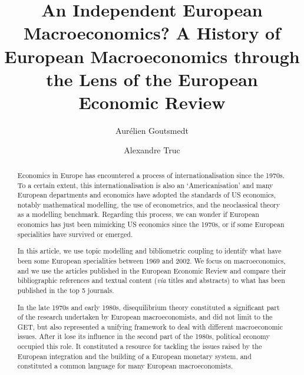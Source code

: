 \documentclass[]{elsarticle} %
\begin{document}
\begin{frontmatter}

  \title{An Independent European Macroeconomics? A History of European
Macroeconomics through the Lens of the European Economic Review}
    \author[1]{Aurélien Goutsmedt%
  }
  
    \author[2]{Alexandre Truc}
  
  
  \begin{abstract}
  Economics in Europe has encountered a process of internationalisation
  since the 1970s. To a certain extent, this internationalisation is
  also an `Americanisation' and many European departments and economics
  have adopted the standards of US economics, notably mathematical
  modelling, the use of econometrics, and the neoclassical theory as a
  modelling benchmark. Regarding this process, we can wonder if European
  economics has just been mimicking US economics since the 1970s, or if
  some European specialities have survived or emerged.

  In this article, we use topic modelling and bibliometric coupling to
  identify what have been some European specialities between 1969 and
  2002. We focus on macroeconomics, and we use the articles published in
  the European Economic Review and compare their bibliographic
  references and textual content (\emph{via} titles and abstracts) to
  what has been published in the top 5 journals.

  In the late 1970s and early 1980s, disequilibrium theory constituted a
  significant part of the research undertaken by European
  macroeconomists, and did not limit to the GET, but also represented a
  unifying framework to deal with different macroeconomic issues. After
  it lose its influence in the second part of the 1980s, political
  economy occupied this role. It constituted a resource for tackling the
  issues raised by the European integration and the building of a
  European monetary system, and constituted a common language for many
  European macroeconomists.
  \end{abstract}
  
 \end{frontmatter}
\end{document}
